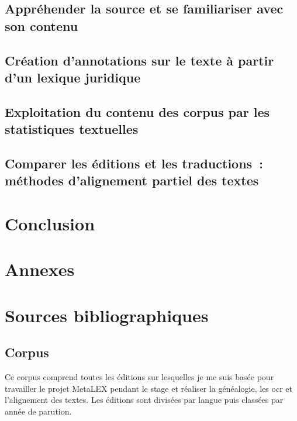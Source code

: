 \documentclass[a4paper,12pt, twoside]{book}
\begin{document}
\chapter{Appréhender la source et se familiariser avec son contenu}

\chapter{\label{chap_annotations}Création d'annotations sur le texte à partir d'un lexique juridique}

\chapter{Exploitation du contenu des corpus par les statistiques textuelles}

\chapter{Comparer les éditions et les traductions~: méthodes d'alignement partiel des textes}


\part*{Conclusion}


\appendix
\part*{Annexes}






\backmatter

\part*{Sources bibliographiques}
\chapter*{Corpus}
Ce corpus comprend toutes les éditions sur lesquelles je me suis basée pour travailler le projet MetaLEX pendant le stage et réaliser la généalogie, les \acrshort{ocr} et l'alignement des textes. Les éditions sont divisées par langue puis classées par année de parution.
\end{document}
